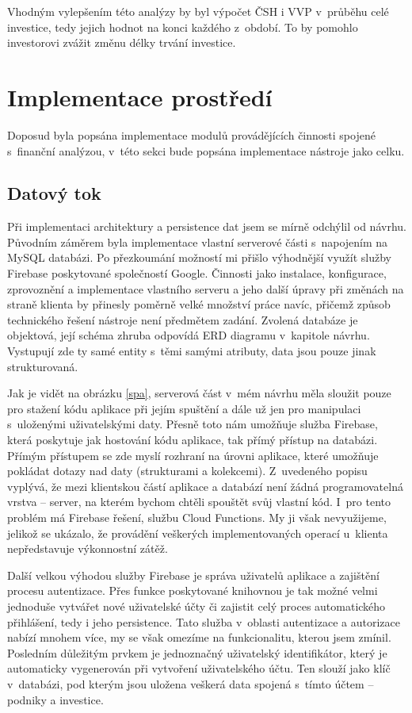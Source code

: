 Vhodným vylepšením této analýzy by byl výpočet ČSH i VVP v~průběhu celé investice, tedy jejich hodnot na konci každého z~období. To by pomohlo investorovi zvážit změnu délky trvání investice.



\section{Implementace prostředí}
Doposud byla popsána implementace modulů provádějících činnosti spojené s~finanční analýzou, v~této sekci bude popsána implementace nástroje jako celku.

\subsection{Datový tok}
Při implementaci architektury a persistence dat jsem se mírně odchýlil od návrhu. Původním záměrem byla implementace vlastní serverové části s~napojením na MySQL databázi. Po přezkoumání možností mi přišlo výhodnější využít služby Firebase poskytované společností Google. Činnosti jako instalace, konfigurace, zprovoznění a implementace vlastního serveru a jeho další úpravy při změnách na straně klienta by přinesly poměrně velké množství práce navíc, přičemž způsob technického řešení nástroje není předmětem zadání. Zvolená databáze je objektová, její schéma zhruba odpovídá ERD diagramu v~kapitole návrhu. Vystupují zde ty samé entity s~těmi samými atributy, data jsou pouze jinak strukturovaná. 

Jak je vidět na obrázku \ref{spa}, serverová část v~mém návrhu měla sloužit pouze pro stažení kódu aplikace při jejím spuštění a dále už jen pro manipulaci s~uloženými uživatelskými daty. Přesně toto nám umožňuje služba Firebase, která poskytuje jak hostování kódu aplikace, tak přímý přístup na databázi. Přímým přístupem se zde myslí rozhraní na úrovni aplikace, které umožňuje pokládat dotazy nad daty (strukturami a kolekcemi). Z~uvedeného popisu vyplývá, že mezi klientskou částí aplikace a databází není žádná programovatelná vrstva -- server, na kterém bychom chtěli spouštět svůj vlastní kód. I~pro tento problém má Firebase řešení, službu Cloud Functions. My ji však nevyužijeme, jelikož se ukázalo, že provádění veškerých implementovaných operací u~klienta nepředstavuje výkonnostní zátěž.

Další velkou výhodou služby Firebase je správa uživatelů aplikace a zajištění procesu autentizace. Přes funkce poskytované knihovnou je tak možné velmi jednoduše vytvářet nové uživatelské účty či zajistit celý proces automatického přihlášení, tedy i jeho persistence. Tato služba v~oblasti autentizace a autorizace nabízí mnohem více, my se však omezíme na funkcionalitu, kterou jsem zmínil. Posledním důležitým prvkem je jednoznačný uživatelský identifikátor, který je automaticky vygenerován při vytvoření uživatelského účtu. Ten slouží jako klíč v~databázi, pod kterým jsou uložena veškerá data spojená s~tímto účtem -- podniky a investice. 

